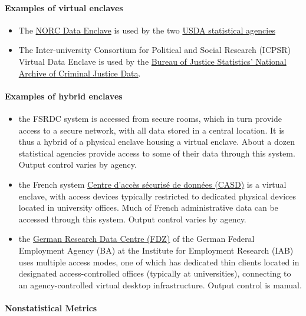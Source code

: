 \paragraph{Examples of virtual enclaves}
\begin{itemize}
    \item The \href{https://www.norc.org/Research/Capabilities/Pages/data-enclave.aspx}{NORC Data Enclave} is used by the two \href{https://www.norc.org/Research/Projects/Pages/usda-ers-data-enclave.aspx}{USDA statistical agencies}
    \item The Inter-university Consortium for Political and Social Research (ICPSR) Virtual Data Enclave is used by the \href{https://www.icpsr.umich.edu/icpsrweb/content/NACJD/index.html}{Bureau of Justice Statistics' National Archive of Criminal Justice Data}. 
\end{itemize}

\paragraph{Examples of hybrid enclaves}
\begin{itemize}
    \item the FSRDC system is accessed from secure rooms, which in turn provide access to a secure network, with all data stored in a central location. It is thus a hybrid of a physical enclave housing a virtual enclave. About a dozen statistical agencies provide access to some of their data through this system. Output control varies by agency.
    \item the French system \href{https://casd.eu}{Centre d'acc\`es s\'ecuris\'e de donn\'ees (CASD)} is a virtual enclave, with access devices typically restricted to dedicated physical devices located in university offices. Much of French administrative data can be accessed through this system. Output control varies by agency.
    \item the \href{https://fdz.iab.de/}{German Research Data Centre (FDZ)} of the German Federal Employment Agency (BA) at the Institute for Employment Research (IAB) uses multiple access modes, one of which has dedicated thin clients located in designated access-controlled offices (typically at universities), connecting to an agency-controlled virtual desktop infrastructure. Output control is manual.
\end{itemize}




\paragraph{Nonstatistical Metrics}

